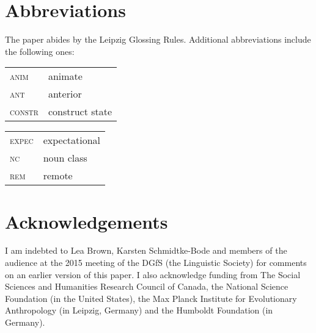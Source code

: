 \documentclass[output=paper]{langsci/langscibook}
\begin{document}
\section*{Abbreviations}

The paper abides by the Leipzig Glossing Rules. Additional abbreviations include the following ones:\\


\begin{tabularx}{.45\textwidth}{lQ}
\textsc{anim}  &{animate} \\
\textsc{ant}  &{anterior}\\
\textsc{constr} & construct state\\
\end{tabularx}
\begin{tabularx}{.45\textwidth}{lQ}
\textsc{expec} & expectational\\
\textsc{nc} & noun class\\
\textsc{rem}  &remote\\
\end{tabularx}



\section*{Acknowledgements}

I am indebted to Lea Brown, Karsten Schmidtke-Bode and members of the audience at the 2015 meeting of the DGfS (the  Linguistic Society) for comments on an earlier version of this paper. I also acknowledge funding from The Social Sciences and Humanities Research Council of Canada, the National Science Foundation (in the United States), the Max Planck Institute for Evolutionary Anthropology (in Leipzig, Germany) and the Humboldt Foundation (in Germany).


\sloppy
\printbibliography[heading=subbibliography,notkeyword=this] 
\end{document}
